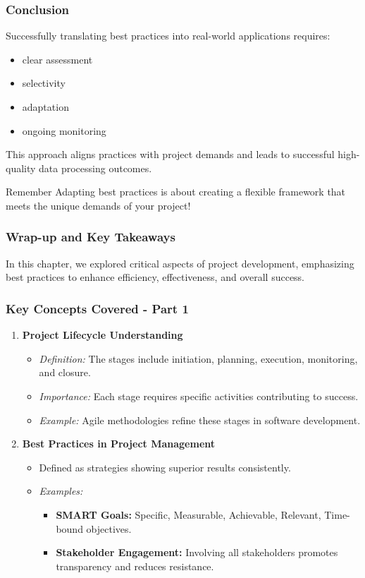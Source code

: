 \documentclass[aspectratio=169]{beamer}
\begin{document}
\begin{frame}[fragile]
    \frametitle{Conclusion}
    Successfully translating best practices into real-world applications requires:
    \begin{itemize}
        \item clear assessment
        \item selectivity
        \item adaptation
        \item ongoing monitoring
    \end{itemize}
    This approach aligns practices with project demands and leads to successful high-quality data processing outcomes.
    
    \begin{block}{Remember}
        Adapting best practices is about creating a flexible framework that meets the unique demands of your project!
    \end{block}
\end{frame}

\begin{frame}[fragile]
    \frametitle{Wrap-up and Key Takeaways}
    In this chapter, we explored critical aspects of project development, emphasizing best practices to enhance efficiency, effectiveness, and overall success.
\end{frame}

\begin{frame}[fragile]
    \frametitle{Key Concepts Covered - Part 1}
    \begin{enumerate}
        \item \textbf{Project Lifecycle Understanding}
        \begin{itemize}
            \item \textit{Definition:} The stages include initiation, planning, execution, monitoring, and closure.
            \item \textit{Importance:} Each stage requires specific activities contributing to success.
            \item \textit{Example:} Agile methodologies refine these stages in software development.
        \end{itemize}

        \item \textbf{Best Practices in Project Management}
        \begin{itemize}
            \item Defined as strategies showing superior results consistently.
            \item \textit{Examples:}
            \begin{itemize}
                \item \textbf{SMART Goals:} Specific, Measurable, Achievable, Relevant, Time-bound objectives.
                \item \textbf{Stakeholder Engagement:} Involving all stakeholders promotes transparency and reduces resistance.
            \end{itemize}
        \end{itemize}
    \end{enumerate}
\end{frame}
\end{document}
